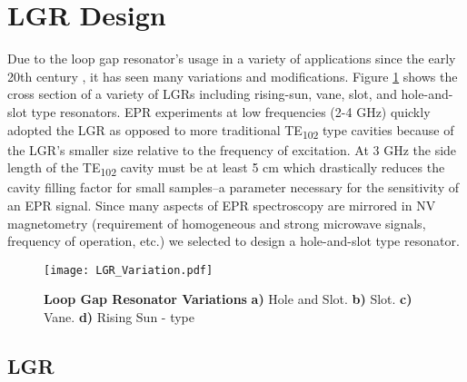 

\section{LGR Design} \label{LGRDesignSection}

Due to the loop gap resonator's usage in a variety of applications since the early 20th century \cite{collins1948microwave}, it has seen many variations and modifications. Figure \ref{LGR_variation} shows the cross section of a variety of LGRs including rising-sun, vane, slot, and hole-and-slot type resonators. EPR experiments at low frequencies (2-4 GHz) quickly adopted the LGR as opposed to more traditional TE\textsubscript{102} type cavities because of the LGR's smaller size relative to the frequency of excitation. At 3 GHz the side length of the TE\textsubscript{102} cavity must be at least 5 cm which drastically reduces the cavity filling factor for small samples--a parameter necessary for the sensitivity of an EPR signal. Since many aspects of EPR spectroscopy are mirrored in NV magnetometry (requirement of homogeneous and strong microwave signals, frequency of operation, etc.) we selected to design a hole-and-slot type resonator. 
\vspace{5mm}
\begin{figure}[t!]
\centering
\texttt{[image: LGR\_Variation.pdf]}  
\caption{\textbf{Loop Gap Resonator Variations} \textbf{a)} Hole and Slot. \textbf{b)} Slot. \textbf{c)} Vane. \textbf{d)} Rising Sun - type}
\label{LGR_variation}
\end{figure}


\subsection{LGR}

